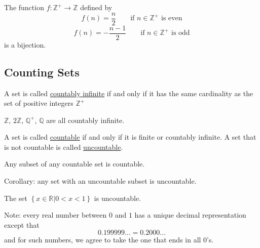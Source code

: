 The function $f:\mathbb Z^+ \rightarrow \mathbb Z$ defined by $$f(n) = \frac{n}{2}\qquad \text{if $n\in\mathbb Z^+$ is even}$$ $$f(n) = -\frac{n-1}{2}\qquad \text{if $n\in\mathbb Z^+$ is odd}$$ is a bijection.

\subsection{Counting Sets}
\begin{definition}
    A set is called \underline{countably infinite} if and only if it has the same cardinality as the set of positive integers $\mathbb Z^+$
\end{definition}

\begin{example}
    $\mathbb Z$, $2\mathbb Z$, $\mathbb Q^+$, $\mathbb Q$ are all countably infinite.
\end{example}

\begin{definition}
    A set is called \underline{countable} if and only if it is finite or countably infinite. A set that is not countable is called \underline{uncountable}.
\end{definition}
\begin{theorm}
    Any subset of any countable set is countable.
\end{theorm}

Corollary: any set with an uncountable subset is uncountable.

\begin{theorm}
    The set $\left\{x\in\mathbb R | 0 < x < 1\right\}$ is uncountable.
\end{theorm}

Note: every real number between $0$ and $1$ has a unique decimal representation except that $$0.199999\dots = 0.2000\dots$$ and for such numbers, we agree to take the one that ends in all $0$'s.

